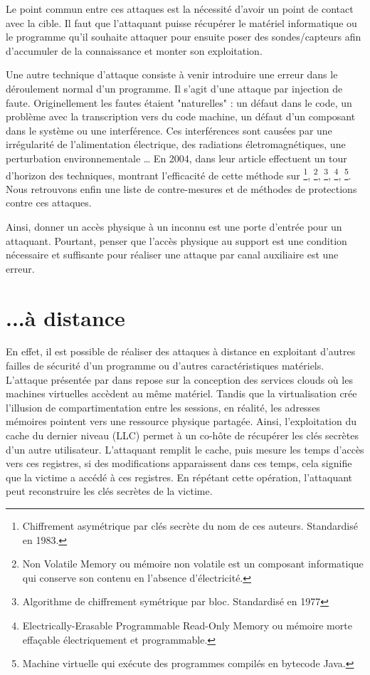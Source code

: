 Le point commun entre ces attaques est la nécessité d'avoir un point de contact avec la cible. Il faut que l'attaquant puisse récupérer le matériel informatique ou le programme qu'il souhaite attaquer pour ensuite poser des sondes/capteurs afin d'accumuler de la connaissance et monter son exploitation.\bigbreak


Une autre technique d'attaque consiste à venir introduire une erreur dans le déroulement normal d'un programme. Il s'agit d'une attaque par injection de faute. Originellement \cite{faultOverview} les fautes étaient "naturelles" : un défaut dans le code, un problème avec la transcription vers du code machine, un défaut d'un composant dans le système ou une interférence. Ces interférences sont causées par une irrégularité de l'alimentation électrique, des radiations életromagnétiques, une perturbation environnementale \etc\dots
En 2004, \citeauthor{Fault_Attacks} dans leur article  \cite{Fault_Attacks} effectuent un tour d'horizon des techniques, montrant l'efficacité de cette méthode sur \footnote{Chiffrement asymétrique par clés secrète du nom de ces auteurs. Standardisé en 1983.}, \footnote{Non Volatile Memory ou mémoire non volatile est un composant informatique qui conserve son contenu en l'absence d'électricité.}, \footnote{Algorithme de chiffrement symétrique par bloc. Standardisé en 1977}, \footnote{Electrically-Erasable Programmable Read-Only Memory ou mémoire morte effaçable électriquement et programmable.}, \footnote{Machine virtuelle qui exécute des programmes compilés en bytecode Java.}. Nous retrouvons enfin une liste de contre-mesures et de méthodes de protections contre ces attaques.\medbreak

Ainsi, donner un accès physique à un inconnu est une porte d'entrée pour un attaquant. Pourtant, penser que l'accès physique au support est une condition nécessaire et suffisante pour réaliser une attaque par canal auxiliaire est une erreur.

\section{...à distance}

En effet, il est possible de réaliser des attaques à distance en exploitant d'autres failles de sécurité d'un programme ou d'autres caractéristiques matériels. L'attaque présentée par \citeauthor{LLC_attack} dans  \cite{LLC_attack} repose sur la conception des services clouds où les machines virtuelles accèdent au même matériel. Tandis que la virtualisation crée l'illusion de compartimentation entre les sessions, en réalité, les adresses mémoires pointent vers une ressource physique partagée. Ainsi, l'exploitation du cache du dernier niveau (LLC) permet à un co-hôte de récupérer les clés secrètes d'un autre utilisateur. L'attaquant remplit le cache, puis mesure les temps d'accès vers ces registres, si des modifications apparaissent dans ces temps, cela signifie que la victime a accédé à ces registres. En répétant cette opération, l'attaquant peut reconstruire les clés secrètes de la victime.\medbreak


